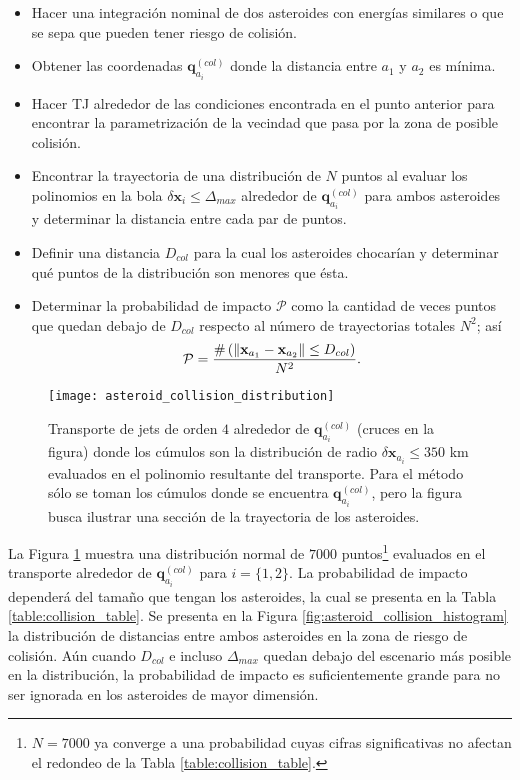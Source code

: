 \begin{itemize}
 \item Hacer una integración nominal de dos asteroides con energías similares o que se sepa que pueden tener riesgo de colisión.
 
 \item Obtener las coordenadas $\mathbf{q}_{a_i}^{(col)}$ donde la distancia entre $a_1$ y $a_2$ es mínima.
 
 \item Hacer TJ alrededor de las condiciones encontrada en el punto anterior para encontrar la parametrización de la vecindad que pasa por la zona de posible colisión.
 
 \item Encontrar la trayectoria de una distribución de $N$ puntos al evaluar los polinomios en la bola $\delta\mathbf{x}_i \leq \Delta_{max}$ alrededor de $\mathbf{q}_{a_i}^{(col)}$ para ambos asteroides y determinar la distancia entre cada par de puntos.
 
 \item Definir una distancia $D_{col}$ para la cual los asteroides chocarían y determinar qué puntos de la distribución son menores que ésta.
 
 \item Determinar la probabilidad de impacto $\mathcal{P}$ como la cantidad de veces puntos que quedan debajo de $D_{col}$ respecto al número de trayectorias totales $N^2$; así
 \begin{equation} 
 \mathcal{P} = \frac{ \# \left( \left\lVert\mathbf{x}_{a_1} - \mathbf{x}_{a_2} \right\rVert    \leq D_{col} \right) }{N^2}.
 \end{equation}
\end{itemize}

\begin{figure}
 \centering
 \texttt{[image: asteroid\_collision\_distribution]}
 \caption{Transporte de jets de orden $4$ alrededor de $\mathbf{q}_{a_i}^{(col)}$ (cruces en la figura) donde los cúmulos son la distribución de radio $\delta\mathbf{x}_{a_i} \leq 350$ km evaluados en el polinomio resultante del transporte. Para el método sólo se toman los cúmulos donde se encuentra $\mathbf{q}_{a_i}^{(col)}$, pero la figura busca ilustrar una sección de la trayectoria de los asteroides.}
 \label{fig:asteroid_collision_distribution}
\end{figure}

La Figura \ref{fig:asteroid_collision_distribution} muestra una distribución normal de $7000$ puntos\footnote{$ N = 7000$ ya converge a una probabilidad cuyas cifras significativas no afectan el redondeo de la Tabla \ref{table:collision_table}.} evaluados en el transporte alrededor de $\mathbf{q}_{a_i}^{(col)}$ para $i = \{1,2\}$. La probabilidad de impacto dependerá del tamaño que tengan los asteroides, la cual se presenta en la Tabla \ref{table:collision_table}. Se presenta en la Figura \ref{fig:asteroid_collision_histogram} la distribución de distancias entre ambos asteroides en la zona de riesgo de colisión. Aún cuando $D_{col}$ e incluso $\Delta_{max}$ quedan debajo del escenario más posible en la distribución, la probabilidad de impacto es suficientemente grande para no ser ignorada en los asteroides de mayor dimensión.

